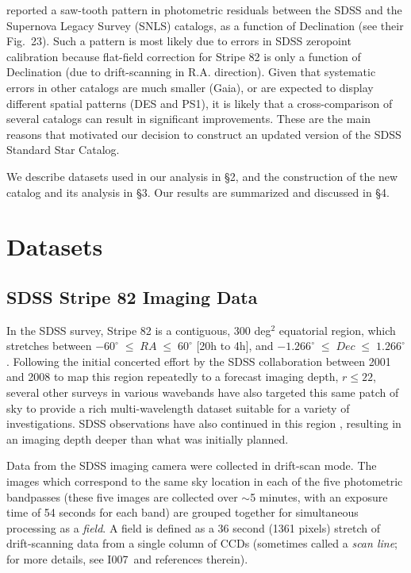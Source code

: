 \documentclass[fleqn,usenatbib]{mnras}
\newcommand{\pO}{\hbox{I007}}
\begin{document}
reported a saw-tooth pattern in photometric residuals between the SDSS and the Supernova Legacy Survey (SNLS) catalogs, as a function of Declination (see their Fig.~23). Such a pattern is most likely due to errors in SDSS zeropoint calibration because
flat-field correction for Stripe 82 is only a function of Declination (due to drift-scanning in R.A. direction). 
Given that systematic errors in other catalogs are much smaller (Gaia), or are expected to display different 
spatial patterns (DES and PS1), it is likely that a cross-comparison of several catalogs can result in
significant improvements. These are the main reasons that motivated our decision to construct an updated version of the 
SDSS Standard Star Catalog. 

We describe datasets used in our analysis in \S2, and the construction of the new catalog and its analysis in \S3. 
Our results are summarized and discussed in \S4. 


\section{Datasets} \label{sec:data}

\subsection{SDSS Stripe 82 Imaging Data} \label{ssec:s82}

In the SDSS survey, Stripe 82 is a contiguous, 300 deg$^2$ equatorial region, which stretches between $-60^{\circ}\;\leq\;RA\;\leq\;60^{\circ}$ [20h to 4h], and $-1.266^{\circ}\;\leq\;Dec\;\leq\;1.266^{\circ}$. Following the initial concerted effort by the SDSS collaboration between 2001 and 2008 to map this region repeatedly to a forecast imaging depth, $r \leq 22$, several other surveys in various wavebands have also targeted this same patch of sky to provide a rich multi-wavelength dataset suitable for a variety of investigations. SDSS observations have also continued in this region \citep[e.g., the SDSS-II search for supernovae,][]{2008AJ....135..338F}, resulting in an imaging depth deeper than what was initially planned.  

Data from the SDSS imaging camera \citep{1998AJ....116.3040G} were collected in drift-scan mode. The images which correspond to the same sky location in each of the five photometric bandpasses (these five images are collected over $\sim$5 minutes, with an exposure time of 54 seconds for each band) are grouped together for simultaneous processing as a {\it field}. A field is defined as a 36 second (1361 pixels)  stretch of drift-scanning data from a single column of CCDs (sometimes called a {\it scan line}; for more details, see \pO\ and references therein). 
\end{document}
